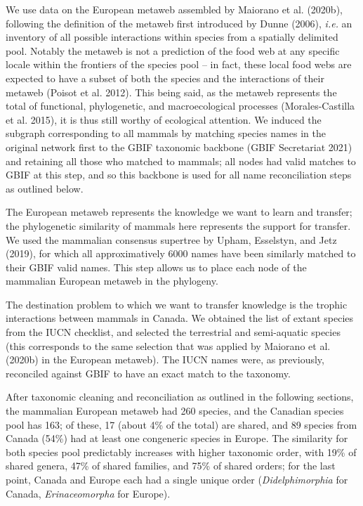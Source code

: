 \documentclass[10pt,oneside]{article}
\begin{document}
We use data on the European metaweb assembled by Maiorano et al.
(2020b), following the definition of the metaweb first introduced by
Dunne (2006), \emph{i.e.} an inventory of all possible interactions
within species from a spatially delimited pool. Notably the metaweb is
not a prediction of the food web at any specific locale within the
frontiers of the species pool -- in fact, these local food webs are
expected to have a subset of both the species and the interactions of
their metaweb (Poisot et al. 2012). This being said, as the metaweb
represents the total of functional, phylogenetic, and macroecological
processes (Morales-Castilla et al. 2015), it is thus still worthy of
ecological attention. We induced the subgraph corresponding to all
mammals by matching species names in the original network first to the
GBIF taxonomic backbone (GBIF Secretariat 2021) and retaining all those
who matched to mammals; all nodes had valid matches to GBIF at this
step, and so this backbone is used for all name reconciliation steps as
outlined below.

The European metaweb represents the knowledge we want to learn and
transfer; the phylogenetic similarity of mammals here represents the
support for transfer. We used the mammalian consensus supertree by
Upham, Esselstyn, and Jetz (2019), for which all approximatively 6000
names have been similarly matched to their GBIF valid names. This step
allows us to place each node of the mammalian European metaweb in the
phylogeny.

The destination problem to which we want to transfer knowledge is the
trophic interactions between mammals in Canada. We obtained the list of
extant species from the IUCN checklist, and selected the terrestrial and
semi-aquatic species (this corresponds to the same selection that was
applied by Maiorano et al. (2020b) in the European metaweb). The IUCN
names were, as previously, reconciled against GBIF to have an exact
match to the taxonomy.

After taxonomic cleaning and reconciliation as outlined in the following
sections, the mammalian European metaweb had 260 species, and the
Canadian species pool has 163; of these, 17 (about 4\% of the total) are
shared, and 89 species from Canada (54\%) had at least one congeneric
species in Europe. The similarity for both species pool predictably
increases with higher taxonomic order, with 19\% of shared genera, 47\%
of shared families, and 75\% of shared orders; for the last point,
Canada and Europe each had a single unique order (\emph{Didelphimorphia}
for Canada, \emph{Erinaceomorpha} for Europe).
\end{document}

